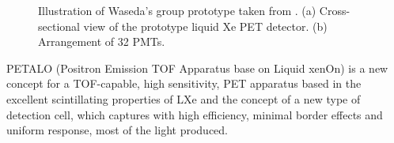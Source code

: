 \begin{figure}[!htb]
	\begin{center}
           \caption{\label{fig.waseda} Illustration of Waseda's group prototype taken from \cite{nishikido05}. (a) Cross-sectional view of the prototype liquid Xe PET detector. (b) Arrangement of 32 PMTs.}
    \end{center}
\end{figure}

PETALO (Positron Emission TOF Apparatus base on Liquid xenOn) is a new concept for a TOF-capable, high sensitivity, PET apparatus based in the excellent scintillating properties of LXe and the concept of a new type of detection cell, which captures with high efficiency, minimal border effects and uniform response, most of the light produced.
 
